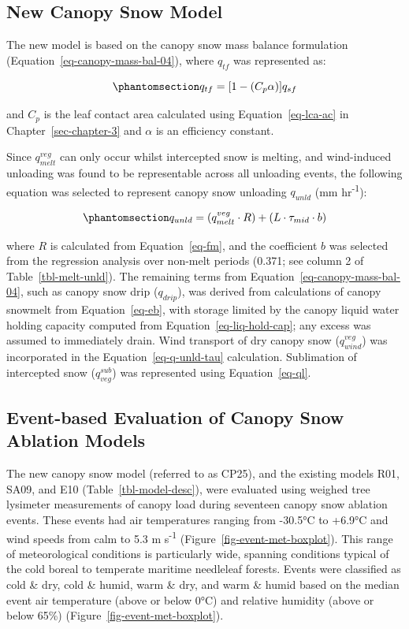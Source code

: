 \documentclass[
  letterpaper,
]{tex/uofsthesis-cs}
\begin{document}
\subsection{New Canopy Snow Model}\label{new-canopy-snow-model}

The new model is based on the canopy snow mass balance formulation
(Equation~\ref{eq-canopy-mass-bal-04}), where \(q_{tf}\) was represented
as:

\begin{equation}\phantomsection\label{eq-qtf}{
q_{tf} = [1 - (C_p\alpha)] q_{sf}
}\end{equation}

and \(C_p\) is the leaf contact area calculated using
Equation~\ref{eq-lca-ac} in Chapter~\ref{sec-chapter-3} and \(\alpha\)
is an efficiency constant.

Since \(q_{melt}^{veg}\) can only occur whilst intercepted snow is
melting, and wind-induced unloading was found to be representable across
all unloading events, the following equation was selected to represent
canopy snow unloading \(q_{unld}\) (mm hr\textsuperscript{-1}):

\begin{equation}\phantomsection\label{eq-unld}{
q_{unld} = (q_{melt}^{veg} \cdot R) + (L \cdot \tau_{mid} \cdot b)
}\end{equation}

where \(R\) is calculated from Equation~\ref{eq-fm}, and the coefficient
\(b\) was selected from the regression analysis over non-melt periods
(0.371; see column 2 of Table~\ref{tbl-melt-unld}). The remaining terms
from Equation~\ref{eq-canopy-mass-bal-04}, such as canopy snow drip
(\(q_{drip}\)), was derived from calculations of canopy snowmelt from
Equation~\ref{eq-eb}, with storage limited by the canopy liquid water
holding capacity computed from Equation~\ref{eq-liq-hold-cap}; any
excess was assumed to immediately drain. Wind transport of dry canopy
snow (\(q_{wind}^{veg}\)) was incorporated in the
Equation~\ref{eq-q-unld-tau} calculation. Sublimation of intercepted
snow (\(q_{veg}^{sub}\)) was represented using Equation~\ref{eq-ql}.

\subsection{Event-based Evaluation of Canopy Snow Ablation
Models}\label{event-based-evaluation-of-canopy-snow-ablation-models}

The new canopy snow model (referred to as CP25), and the existing models
R01, SA09, and E10 (Table~\ref{tbl-model-desc}), were evaluated using
weighed tree lysimeter measurements of canopy load during seventeen
canopy snow ablation events. These events had air temperatures ranging
from -30.5°C to +6.9°C and wind speeds from calm to 5.3 m
s\textsuperscript{-1} (Figure~\ref{fig-event-met-boxplot}). This range
of meteorological conditions is particularly wide, spanning conditions
typical of the cold boreal to temperate maritime needleleaf forests.
Events were classified as cold \& dry, cold \& humid, warm \& dry, and
warm \& humid based on the median event air temperature (above or below
0°C) and relative humidity (above or below 65\%)
(Figure~\ref{fig-event-met-boxplot}).
\end{document}
